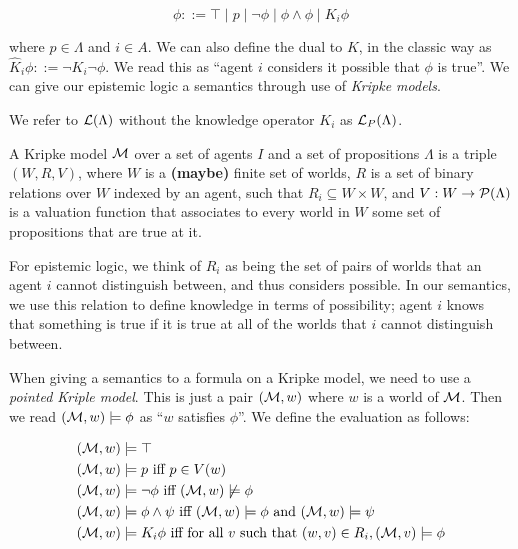 \documentclass[12pt, a4paper]{article}
\begin{document}
\begin{equation*}
  \phi ::= \top \mid p \mid \neg \phi \mid \phi \land \phi \mid K_i \phi
\end{equation*}

\noindent where $p \in \Lambda$ and $i \in A$. We can also define the dual to
$K$, in the classic way as $\widehat K_i \phi ::= \neg K_i \neg \phi$. We read
this as ``agent $i$ considers it possible that $\phi$ is true''. We can give our
epistemic logic a semantics through use of \textit{Kripke models}.

We refer to $\mathcal{L}(\Lambda)$ without the knowledge operator $K_i$ as
$\mathcal{L}_P(\Lambda)$.

\bigskip

A Kripke model $\mathcal{M}$ over a set of agents $I$ and a set of propositions
$\Lambda$ is a triple $(W, R, V)$, where $W$ is a \textbf{(maybe)} finite set of
worlds, $R$ is a set of binary relations over $W$ indexed by an agent, such that
$R_i \subseteq W \times W$, and $V : W \rightarrow \mathcal{P}(\Lambda)$ is a
valuation function that associates to every world in $W$ some set of
propositions that are true at it.

For epistemic logic, we think of $R_i$ as being the set of pairs of worlds that
an agent $i$ cannot distinguish between, and thus considers possible. In our
semantics, we use this relation to define knowledge in terms of possibility;
agent $i$ knows that something is true if it is true at all of the worlds that
$i$ cannot distinguish between.

\bigskip

When giving a semantics to a formula on a Kripke model, we need to use a
\textit{pointed Kriple model}. This is just a pair $(\mathcal{M}, w)$ where $w$ is a
world of $\mathcal{M}$. Then we read $(\mathcal{M}, w) \models \phi$ as ``$w$ satisfies
$\phi$''. We define the evaluation as follows:

\begin{align*}
  (\mathcal{M}, w) & \models \top \\
  (\mathcal{M}, w) & \models p \text{ iff } p \in V(w) \\
  (\mathcal{M}, w) & \models \neg \phi \text{ iff } (\mathcal{M}, w) \not \models \phi \\
  (\mathcal{M}, w) & \models \phi \land \psi \text{ iff } (\mathcal{M}, w) \models \phi \text{ and } (\mathcal{M}, w) \models \psi \\
  (\mathcal{M}, w) & \models K_i \phi \text{ iff for all $v$ such that } (w, v) \in R_i, (\mathcal{M}, v) \models \phi 
\end{align*}
\end{document}
